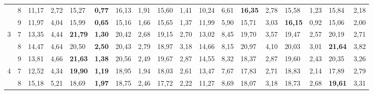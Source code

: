 \documentclass[conference]{IEEEtran}
\begin{document}
\begin{table}[]
\begin{tabular}{|cl|ll|ll|ll|ll|ll|ll|ll|ll|}
		\multicolumn{1}{|c|}{} & 8 & \multicolumn{1}{l|}{11,17} & 2,72 & \multicolumn{1}{l|}{15,27} & \textbf{0,77} & \multicolumn{1}{l|}{16,13} & 1,91 & \multicolumn{1}{l|}{15,60} & 1,41 & \multicolumn{1}{l|}{10,24} & 6,61 & \multicolumn{1}{l|}{\textbf{16,35}} & 2,78 & \multicolumn{1}{l|}{15,58} & 1,23 & \multicolumn{1}{l|}{15,84} & 2,18 \\ \cline{2-18} 
		\multicolumn{1}{|c|}{} & 9 & \multicolumn{1}{l|}{11,97} & 4,04 & \multicolumn{1}{l|}{15,99} & \textbf{0,65} & \multicolumn{1}{l|}{15,16} & 1,66 & \multicolumn{1}{l|}{15,65} & 1,37 & \multicolumn{1}{l|}{11,99} & 5,90 & \multicolumn{1}{l|}{15,71} & 3,03 & \multicolumn{1}{l|}{\textbf{16,15}} & 0,92 & \multicolumn{1}{l|}{15,06} & 2,00 \\ \hline
		\multicolumn{1}{|c|}{\multirow{3}{*}{3}} & 7 & \multicolumn{1}{l|}{13,35} & 4,44 & \multicolumn{1}{l|}{\textbf{21,79}} & \textbf{1,30} & \multicolumn{1}{l|}{20,42} & 2,68 & \multicolumn{1}{l|}{19,15} & 2,70 & \multicolumn{1}{l|}{13,02} & 8,45 & \multicolumn{1}{l|}{19,70} & 3,57 & \multicolumn{1}{l|}{19,47} & 2,57 & \multicolumn{1}{l|}{20,19} & 2,71 \\ \cline{2-18} 
		\multicolumn{1}{|c|}{} & 8 & \multicolumn{1}{l|}{14,47} & 4,64 & \multicolumn{1}{l|}{20,50} & \textbf{2,50} & \multicolumn{1}{l|}{20,43} & 2,79 & \multicolumn{1}{l|}{18,97} & 3,18 & \multicolumn{1}{l|}{14,66} & 8,15 & \multicolumn{1}{l|}{20,97} & 4,10 & \multicolumn{1}{l|}{20,03} & 3,01 & \multicolumn{1}{l|}{\textbf{21,64}} & 3,82 \\ \cline{2-18} 
		\multicolumn{1}{|c|}{} & 9 & \multicolumn{1}{l|}{13,81} & 4,66 & \multicolumn{1}{l|}{\textbf{21,63}} & \textbf{1,38} & \multicolumn{1}{l|}{20,56} & 2,49 & \multicolumn{1}{l|}{19,67} & 2,87 & \multicolumn{1}{l|}{14,55} & 8,32 & \multicolumn{1}{l|}{18,37} & 2,87 & \multicolumn{1}{l|}{19,60} & 2,43 & \multicolumn{1}{l|}{20,35} & 3,26 \\ \hline
		\multicolumn{1}{|c|}{\multirow{3}{*}{4}} & 7 & \multicolumn{1}{l|}{12,52} & 4,34 & \multicolumn{1}{l|}{\textbf{19,90}} & \textbf{1,19} & \multicolumn{1}{l|}{18,95} & 1,94 & \multicolumn{1}{l|}{18,03} & 2,61 & \multicolumn{1}{l|}{13,47} & 7,67 & \multicolumn{1}{l|}{17,83} & 2,71 & \multicolumn{1}{l|}{18,83} & 2,14 & \multicolumn{1}{l|}{17,89} & 2,79 \\ \cline{2-18} 
		\multicolumn{1}{|c|}{} & 8 & \multicolumn{1}{l|}{15,18} & 5,21 & \multicolumn{1}{l|}{18,69} & \textbf{1,97} & \multicolumn{1}{l|}{18,75} & 2,46 & \multicolumn{1}{l|}{17,72} & 2,22 & \multicolumn{1}{l|}{11,27} & 8,69 & \multicolumn{1}{l|}{18,07} & 3,18 & \multicolumn{1}{l|}{18,73} & 2,68 & \multicolumn{1}{l|}{\textbf{19,61}} & 3,31 \\ \cline{2-18} 

\end{tabular}
\end{table}
\end{document}
